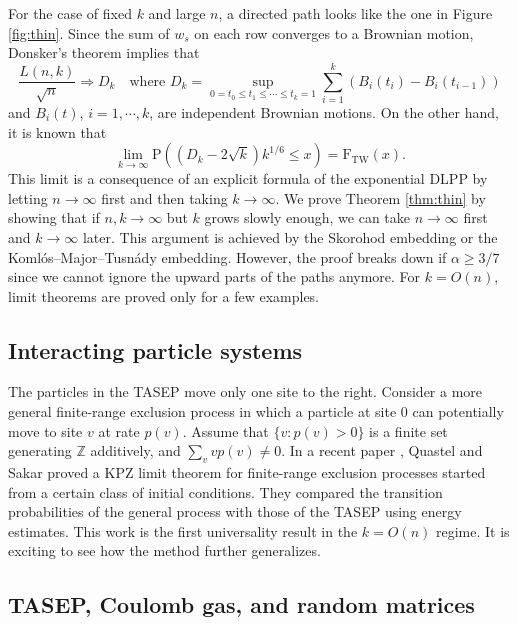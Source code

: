 \documentclass[10pt]{article}
\theoremstyle{plain}
\theoremstyle{definition}
\newcommand{\beqq}{ \begin{equation*} }
\newcommand{\eeqq}{ \end{equation*} }
\newcommand{\Z}{\mathbb{Z}}
\newcommand{\Prob}{\mathrm{P}}    %
\newcommand{\TW}{\mathrm{TW}}  %
\newcommand{\FTW}{\mathrm{F}_{\TW}}  %
\numberwithin{equation}{section}
\begin{document}
For the case of fixed $k$ and large $n$, a directed path looks like the one in Figure \ref{fig:thin}. Since the sum of $w_s$ on each row converges to a Brownian motion, Donsker's theorem implies that 
\beqq
	 \frac{L(n,k)}{\sqrt{n}} \Rightarrow   D_k \quad \text{where $D_k= \sup_{0=t_0\le t_1\le \cdots\le t_k=1} \sum_{i=1}^k (B_i(t_i)- B_i(t_{i-1}))$}
\eeqq
and $B_i(t)$, $i=1, \cdots, k$, are independent Brownian motions. 
On the other hand, it is known \cite{Baryshnikov01} that  
\beqq
	\lim_{k\to \infty} \Prob( (D_k- 2\sqrt{k})k^{1/6} \le x) = \FTW(x). 
\eeqq
This limit is a consequence of an explicit formula of the exponential DLPP by letting $n\to\infty$ first and then taking $k\to \infty$. 
We prove Theorem \ref{thm:thin} by showing that if $n, k\to \infty$ but $k$ grows slowly enough, we can take $n\to \infty$ first and $k\to \infty$ later. 
This argument is achieved by the Skorohod embedding or the Koml\'os--Major--Tusn\'ady embedding. 
However, the proof breaks down if $\alpha\ge 3/7$ since we cannot ignore the upward parts of the paths anymore. 
For $k=O(n)$, limit theorems are proved only for a few examples. %
 

\subsection{Interacting particle systems}

The particles in the TASEP move only one site to the right. Consider a more general finite-range exclusion process in which a particle at site $0$ can potentially move to site $v$ at rate $p(v)$. 
Assume that $\{v: p(v)>0\}$ is a finite set  generating $\Z$ additively, and $\sum_v v p(v)\neq 0$. 
In a recent paper \cite{Quastel-Sakar20}, Quastel and Sakar proved a KPZ limit theorem for finite-range exclusion processes started from a certain class of initial conditions. 
They compared the transition probabilities of the general process with those of the TASEP using energy estimates. 
This work is the first universality result in the $k=O(n)$ regime. It is exciting to see how the method further generalizes.  

\subsection{TASEP, Coulomb gas, and random matrices} \label{sec:TASEPRM}
\end{document}
